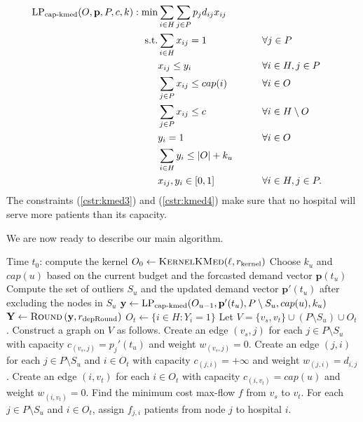 \begin{alignat}{2}  
  \text{LP}_{\text{cap-kmed}}(O, \mathbf{p}, P, c, k): \min  &  \sum_{i \in H}\sum_{j \in P} p_j d_{ij} x_{ij} \nonumber\\
    \text{s.t.} & \sum_{i \in H} x_{ij} = 1    &\qquad& \forall j \in P  \\
                             &  x_{ij} \leq y_i      && \forall i \in H, j \in P \ \\
                             & \sum_{j \in P} x_{ij} \leq cap(i)      && \forall i \in O  \label{cstr:kmed3} \\
                             & \sum_{j \in P} x_{ij} \leq c      && \forall i \in H \setminus O  \label{cstr:kmed4} \\
                             & y_i = 1    && \forall i \in O  \\
                             &  \sum_{i\in H} y_{i} \leq |O|+k_u      &&  \\
                             & x_{ij},  y_i \in [0,1]&& \forall i \in H, j \in P.\nonumber
\end{alignat}
The constraints (\ref{cstr:kmed3}) and (\ref{cstr:kmed4}) make sure that no hospital will serve more patients than its capacity. 


We are now ready to describe our main algorithm.
\begin{algorithm}[h]
\caption{$\textsc{OnlineKMed} \left(H, P, \mathbf{p}, w, \ell, r_{\text{kernel}}, r_{\text{depRound}} \right)$}
\begin{algorithmic}[1]
\STATE Time $t_0$: compute the kernel $O_0 \gets \textsc{KernelKMed}(\ell, r_{\text{kernel}})$
	\STATE Choose $k_u$ and $cap(u)$ based on the current budget and the forcasted demand vector $\mathbf{p}(t_u)$
	\STATE Compute the set of outliers $S_u$ and the updated demand vector $\mathbf{p}'(t_u)$ after excluding the nodes in $S_u$
	\STATE $\mathbf{y} \gets \text{LP}_{\text{cap-kmed}}(O_{u-1}, \mathbf{p}'(t_u), P \setminus S_u, cap(u), k_u)$
	\STATE $\mathbf{Y} \gets \textsc{Round}\left( \mathbf{y}, r_{\text{depRound}} \right)$
	\STATE $O_t \gets \{i \in H: Y_i = 1\}$
	\STATE Let $V = \{v_s, v_t\} \cup (P \setminus S_u) \cup O_t$. Construct a graph on $V$ as follows.
	\STATE Create an edge $(v_s, j)$ for each $j \in P \setminus S_u$ with capacity $c_{(v_s, j)} = p_j'(t_u)$ and weight $w_{(v_s, j)} = 0$.
	\STATE Create an edge $(j, i)$ for each $j \in P \setminus S_u$ and $i \in O_t$ with capacity $c_{(j, i)} = +\infty$ and weight $w_{(j, i)} = d_{i, j}$.
	\STATE Create an edge $(i, v_t)$ for each $i \in O_t$ with capacity $c_{(i, v_t)} = cap(u)$ and weight $w_{(i, v_t)} = 0$.
	\STATE Find the minimum cost max-flow $f$ from $v_s$ to $v_t$. For each $j \in P \setminus S_u$ and $i \in O_t$, assign $f_{j,i}$ patients from node $j$ to hospital $i$.
\ENDFOR
\end{algorithmic} 
\end{algorithm}



